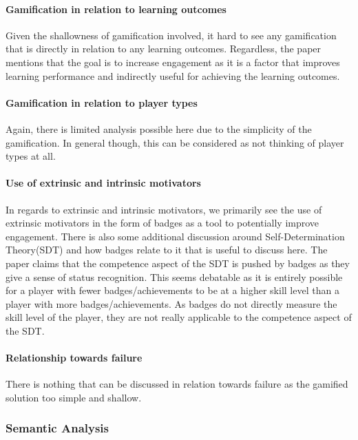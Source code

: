 \paragraph{Gamification in relation to learning outcomes}
Given the shallowness of gamification involved, it hard to see any gamification that is directly in relation to any learning outcomes. Regardless, the paper mentions that the goal is to increase engagement as it is a factor that improves learning performance and indirectly useful for achieving the learning outcomes. 

\paragraph{Gamification in relation to player types}
Again, there is limited analysis possible here due to the simplicity of the gamification. In general though, this can be considered as not thinking of player types at all. 

\paragraph{Use of extrinsic and intrinsic motivators}
In regards to extrinsic and intrinsic motivators, we primarily see the use of extrinsic motivators in the form of badges as a tool to potentially improve engagement. There is also some additional discussion around Self-Determination Theory(SDT) and how badges relate to it that is useful to discuss here. 
The paper claims that the competence aspect of the SDT is pushed by badges as they give a sense of status recognition. This seems debatable as it is entirely possible for a player with fewer badges/achievements to be at a higher skill level than a player with more badges/achievements. As badges do not directly measure the skill level of the player, they are not really applicable to the competence aspect of the SDT. 

\paragraph{Relationship towards failure}
There is nothing that can be discussed in relation towards failure as the gamified solution too simple and shallow. 

\subsubsection{Semantic Analysis}
